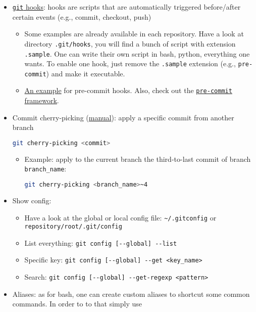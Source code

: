 \documentclass[a4paper,12pt,%
              final%
              ]{article}
\begin{document}
\begin{itemize}
\begin{itemize}
    \end{itemize}
  \item \href{https://git-scm.com/book/en/v2/Customizing-Git-Git-Hooks}{\texttt{git} hooks}: hooks are scripts that are automatically triggered before/after certain events (e.g., commit, checkout, push)
      \begin{itemize}
        \item Some examples are already available in each repository. Have a look at directory \texttt{.git/hooks}, you will find a bunch of script with extension \texttt{.sample}. One can write their own script in bash, python, everything one wants. To enable one hook, just remove the \texttt{.sample} extension (e.g., \texttt{pre-commit}) and make it executable.
        \item \href{https://verdantfox.com/blog/how-to-use-git-pre-commit-hooks-the-hard-way-and-the-easy-way}{An example} for pre-commit hooks. Also, check out the \href{https://github.com/pre-commit/pre-commit-hooks}{\texttt{pre-commit} framework}.
      \end{itemize}
  \item Commit cherry-picking (\href{https://git-scm.com/docs/git-cherry-pick}{manual}): apply a specific commit from another branch
\begin{lstlisting}[language=bash]
git cherry-picking <commit>
\end{lstlisting}
    \begin{itemize}
      \item Example: apply to the current branch the third-to-last commit of branch \verb|branch_name|:
\begin{lstlisting}[language=bash]
git cherry-picking <branch_name>~4
\end{lstlisting}
    \end{itemize}
  \item Show config:
    \begin{itemize}
      \item Have a look at the global or local config file: \verb|~/.gitconfig| or \verb|repository/root/.git/config|
      \item List everything: \verb|git config [--global] --list|
      \item Specific key: \verb|git config [--global] --get <key_name>|
      \item Search: \verb|git config [--global] --get-regexp <pattern>|
    \end{itemize}
  \item Aliases: as for bash, one can create custom aliases to shortcut some common commands. In order to to that simply use

\end{itemize}
\end{document}
